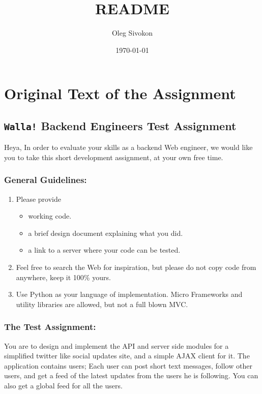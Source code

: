 \documentclass[11pt]{article}
\title{README}
\author{Oleg Sivokon}
\date{\today}
\begin{document}
\maketitle

\setcounter{tocdepth}{3}
\tableofcontents
\vspace*{1cm}

\section{Original Text of the Assignment}
\label{sec-1}
\subsection{\texttt{Walla!} Backend Engineers Test Assignment}
\label{sec-1-1}

   
   Heya,
   In order to evaluate your skills as a backend Web engineer, we
   would like you to take this short development assignment, at your
   own free time.
   
\subsubsection{General Guidelines:}
\label{sec-1-1-1}

\begin{enumerate}
\item Please provide
\begin{itemize}
\item working code.
\item a brief design document explaining what you did.
\item a link to a server where your code can be tested.
\end{itemize}
\item Feel free to search the Web for inspiration, but please do not
       copy code from anywhere, keep it 100\% yours.
\item Use Python as your language of implementation. Micro​ Frameworks
       and utility libraries are allowed, but not a full blown MVC.
\end{enumerate}
\subsubsection{The Test Assignment:}
\label{sec-1-1-2}

    You are to design and implement the API and server side modules
    for a simplified twitter like social updates site, and a simple
    AJAX client for it. The application contains users; Each user can
    post short text messages, follow other users, and get a feed of
    the latest updates from the users he is following. You can also
    get a global feed for all the users.
    
\end{document}
